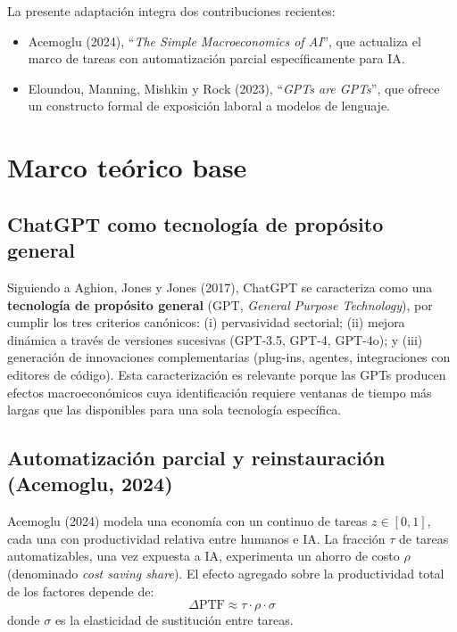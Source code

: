 \documentclass[11pt,a4paper]{article}
\theoremstyle{definition}
\begin{document}
La presente adaptación integra dos contribuciones recientes:
\begin{itemize}[leftmargin=*]
  \item Acemoglu (2024), ``\textit{The Simple Macroeconomics of AI}'', que actualiza el marco de tareas con automatización parcial específicamente para IA.
  \item Eloundou, Manning, Mishkin y Rock (2023), ``\textit{GPTs are GPTs}'', que ofrece un constructo formal de exposición laboral a modelos de lenguaje.
\end{itemize}

\section{Marco teórico base}

\subsection{ChatGPT como tecnología de propósito general}

Siguiendo a Aghion, Jones y Jones (2017), ChatGPT se caracteriza como una \textbf{tecnología de propósito general} (GPT, \textit{General Purpose Technology}), por cumplir los tres criterios canónicos: (i) pervasividad sectorial; (ii) mejora dinámica a través de versiones sucesivas (GPT-3.5, GPT-4, GPT-4o); y (iii) generación de innovaciones complementarias (plug-ins, agentes, integraciones con editores de código). Esta caracterización es relevante porque las GPTs producen efectos macroeconómicos cuya identificación requiere ventanas de tiempo más largas que las disponibles para una sola tecnología específica.

\subsection{Automatización parcial y reinstauración (Acemoglu, 2024)}

Acemoglu (2024) modela una economía con un continuo de tareas $z \in [0, 1]$, cada una con productividad relativa entre humanos e IA. La fracción $\tau$ de tareas automatizables, una vez expuesta a IA, experimenta un ahorro de costo $\rho$ (denominado \textit{cost saving share}). El efecto agregado sobre la productividad total de los factores depende de:
\begin{equation}
\Delta \text{PTF} \approx \tau \cdot \rho \cdot \sigma
\end{equation}
donde $\sigma$ es la elasticidad de sustitución entre tareas.
\end{document}
